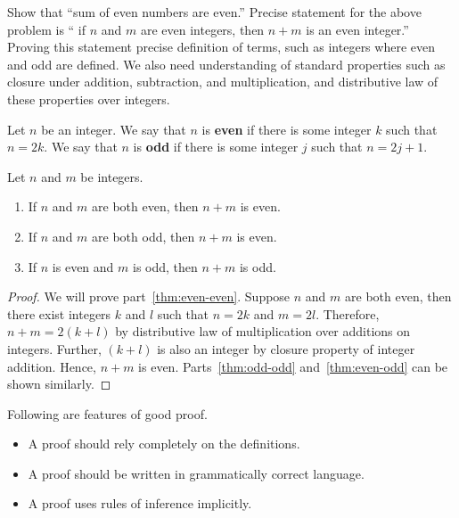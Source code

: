 \documentclass[a4paper,english,12pt]{article}
\begin{document}
\begin{exmp} Show that ``sum of even numbers are even.'' Precise statement for the above problem is `` if $n$ and $m$ are even integers, then $n+m$ is an even integer.''\\
Proving this statement precise definition of terms, such as integers where even and odd are defined. We also need understanding of standard properties such as closure under addition, subtraction, and multiplication, and distributive law of these properties over integers.
\end{exmp}
\begin{defn}Let $n$ be an integer. We say that $n$ is \textbf{even} if there is some integer $k$ such that $n=2k$. We say that $n$ is \textbf{odd} if there is some integer $j$ such that $n = 2j+1$.
\end{defn}
\begin{thm} Let $n$ and $m$ be integers.
\begin{enumerate}[i]
	\item \label{thm:even-even} If $n$ and $m$ are both even, then $n+m$ is even.
	\item \label{thm:odd-odd}If $n$ and $m$ are both odd, then $n+m$ is even.
	\item \label{thm:even-odd} If $n$ is even and $m$ is odd, then $n+m$ is odd.
\end{enumerate}
\end{thm}
\begin{proof}
We will prove part~\ref{thm:even-even}. Suppose $n$ and $m$ are both even, then there exist integers $k$ and $l$ such that $n=2k$ and $m=2l$. Therefore, $n+m=2(k+l)$ by distributive law of multiplication over additions on integers. Further, $(k+l)$ is also an integer by closure property of integer addition. Hence, $n+m$ is even. Parts~\ref{thm:odd-odd} and~\ref{thm:even-odd} can be shown similarly.
\end{proof}

Following are features of good proof. 
\begin{itemize}
\item A proof should rely completely on the definitions.
\item A proof should be written in grammatically correct language.
\item A proof uses rules of inference implicitly.
\end{itemize}
\end{document}
